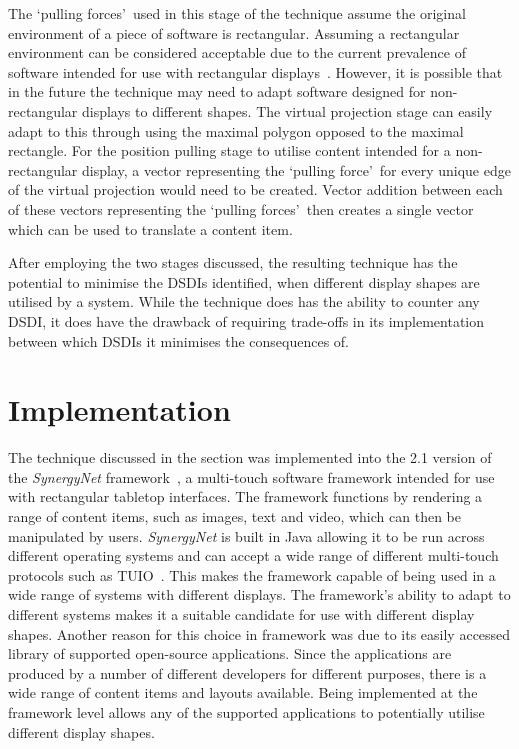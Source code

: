 \documentclass{bmcart}
\begin{document}
The \lq pulling forces\rq\ used in this stage of the technique assume the original environment of a piece of software is rectangular.
Assuming a rectangular environment can be considered acceptable due to the current prevalence of software intended for use with rectangular displays~\cite{VanDam2001}.
However, it is possible that in the future the technique may need to adapt software designed for non-rectangular displays to different shapes.
The virtual projection stage can easily adapt to this through using the maximal polygon opposed to the maximal rectangle.
For the position pulling stage to utilise content intended for a non-rectangular display, a vector representing the \lq pulling force\rq\ for every unique edge of the virtual projection would need to be created.
Vector addition between each of these vectors representing the \lq pulling forces\rq\ then creates a single vector which can be used to translate a content item.

After employing the two stages discussed, the resulting technique has the potential to minimise the \acp{DSDI} identified, when different display shapes are utilised by a system. 
While the technique does has the ability to counter any \ac{DSDI}, it does have the drawback of requiring trade-offs in its implementation between which \acp{DSDI} it minimises the consequences of.

\section*{Implementation}
\label{sec:implementation}

The technique discussed in the  section was implemented into the 2.1 version of the {\emph{SynergyNet}} framework~\cite{McNaughton2017,AlAgha2010}, a multi-touch software framework intended for use with rectangular tabletop interfaces.
The framework functions by rendering a range of content items, such as images, text and video, which can then be manipulated by users.
{\emph{SynergyNet}} is built in Java allowing it to be run across different operating systems and can accept a wide range of different multi-touch protocols such as TUIO~\cite{Kaltenbrunner2007}.
This makes the framework capable of being used in a wide range of systems with different displays.
The framework's ability to adapt to different systems makes it a suitable candidate for use with different display shapes.
Another reason for this choice in framework was due to its easily accessed library of supported open-source applications.
Since the applications are produced by a number of different developers for different purposes, there is a wide range of content items and layouts available.
Being implemented at the framework level allows any of the supported applications to potentially utilise different display shapes.
\end{document}
